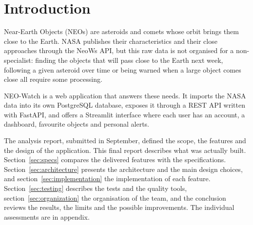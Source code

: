 \section{Introduction}

Near-Earth Objects (NEOs) are asteroids and comets whose orbit brings them close to the Earth.
NASA publishes their characteristics and their close approaches through the NeoWs API, but this
raw data is not organised for a non-specialist: finding the objects that will pass close to the
Earth next week, following a given asteroid over time or being warned when a large object comes
close all require some processing.

\vspace{0.25cm}

NEO-Watch is a web application that answers these needs. It imports the NASA data into its own
PostgreSQL database, exposes it through a REST API written with FastAPI, and offers a Streamlit
interface where each user has an account, a dashboard, favourite objects and personal alerts.

\vspace{0.25cm}

The analysis report, submitted in September, defined the scope, the features and the design of
the application. This final report describes what was actually built. Section~\ref{sec:specs}
compares the delivered features with the specifications. Section~\ref{sec:architecture} presents
the architecture and the main design choices, and section~\ref{sec:implementation} the
implementation of each feature. Section~\ref{sec:testing} describes the tests and the quality
tools, section~\ref{sec:organization} the organisation of the team, and the conclusion reviews the
results, the limits and the possible improvements. The individual assessments are in appendix.
